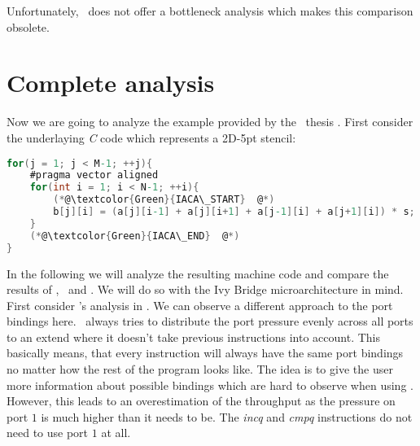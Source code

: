 Unfortunately, \osaca\ does not offer a bottleneck analysis which makes this comparison obsolete.


\section{Complete analysis}

Now we are going to analyze the example provided by the \osaca\ thesis \cite{osaca-thesis}. First consider the underlaying \emph{C} code which represents a 2D-5pt stencil:


\begin{mdframed}[backgroundcolor=light-gray, roundcorner=10pt,leftmargin=1, rightmargin=1, innerleftmargin=15, innertopmargin=1,innerbottommargin=1, outerlinewidth=1, linecolor=light-gray]
    \begin{lstlisting}[language=C, basicstyle=\scriptsize]
for(j = 1; j < M-1; ++j){
    #pragma vector aligned
    for(int i = 1; i < N-1; ++i){
        (*@\textcolor{Green}{IACA\_START}  @*)
        b[j][i] = (a[j][i-1] + a[j][i+1] + a[j-1][i] + a[j+1][i]) * s;
    }
    (*@\textcolor{Green}{IACA\_END}  @*)
}
    \end{lstlisting}
\end{mdframed}

In the following we will analyze the resulting machine code and compare the results of \iaca, \osaca\ and \suaca. We will do so with the Ivy Bridge microarchitecture in mind. First consider \osaca's analysis in . We can observe a different approach to the port bindings here. \osaca\ always tries to distribute the port pressure evenly across all ports to an extend where it doesn't take previous instructions into account. This basically means, that every instruction will always have the same port bindings no matter how the rest of the program looks like. The idea is to give the user more information about possible bindings which are hard to observe when using \iaca. However, this leads to an overestimation of the throughput as the pressure on port $1$ is much higher than it needs to be. The \emph{incq} and \emph{cmpq} instructions do not need to use port $1$ at all.


